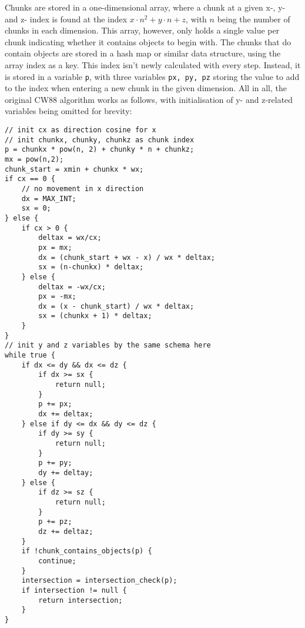 \newline
Chunks are stored in a one-dimensional array,
where a chunk at a given x-, y- and z- index is found at the index \(x \cdot n^2 + y \cdot n + z\),
with \(n\) being the number of chunks in each dimension.
This array, however, only holds a single value per chunk indicating whether it contains objects to begin with.
The chunks that do contain objects are stored in a hash map or similar data structure,
using the array index as a key.
\newline
This index isn't newly calculated with every step.
Instead, it is stored in a variable \verb|p|,
with three variables \verb|px, py, pz| storing the value to add to the index when entering a new chunk in the given dimension.
\newline
All in all, the original CW88 algorithm works as follows,
with initialisation of y- and z-related variables being omitted for brevity:

\begin{verbatim}
// init cx as direction cosine for x
// init chunkx, chunky, chunkz as chunk index
p = chunkx * pow(n, 2) + chunky * n + chunkz;
mx = pow(n,2);
chunk_start = xmin + chunkx * wx;
if cx == 0 {
	// no movement in x direction
	dx = MAX_INT;
	sx = 0;
} else {
	if cx > 0 {
		deltax = wx/cx;
		px = mx;
		dx = (chunk_start + wx - x) / wx * deltax;
		sx = (n-chunkx) * deltax;
	} else {
		deltax = -wx/cx;
		px = -mx;
		dx = (x - chunk_start) / wx * deltax;
		sx = (chunkx + 1) * deltax;
	}
}
// init y and z variables by the same schema here
while true {
	if dx <= dy && dx <= dz {
		if dx >= sx {
            return null;
        }
		p += px;
		dx += deltax;
	} else if dy <= dx && dy <= dz {
		if dy >= sy {
            return null;
        }
		p += py;
		dy += deltay;
	} else {
		if dz >= sz {
            return null;
        }
		p += pz;
		dz += deltaz;
	}
    if !chunk_contains_objects(p) {
        continue;
    }
    intersection = intersection_check(p);
    if intersection != null {
        return intersection;
    }
}
\end{verbatim}

